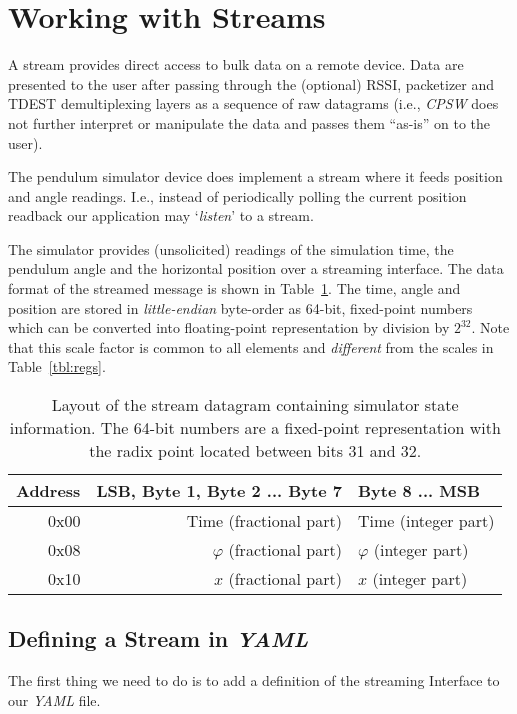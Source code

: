 \documentclass[10pt]{article}
\newcommand{\ita}[1]{\emph{#1}}
\newcommand{\cpsw}      {\ita {CPSW}}
\newcommand{\yaml}      {\ita {YAML}}
\newcounter{tbls}
\begin{document}
\section{Working with Streams}
A stream provides direct access to bulk data on a remote device. Data are
presented to the user after passing through the (optional) RSSI, packetizer
and TDEST demultiplexing layers as a sequence of raw datagrams (i.e., \cpsw{}
does not further interpret or manipulate the data and passes them ``as-is''
on to the user).

The pendulum simulator device does implement a stream where it feeds position
and angle readings. I.e., instead of periodically polling the current position
readback our application may `{\em listen}' to a stream.

The simulator provides (unsolicited) readings of the simulation time, the pendulum
angle and the horizontal position over a streaming interface. The data format
of the streamed message is shown in Table~\ref{tbl:strmmsg}. The time, angle and
position are stored in {\em little-endian} byte-order as 64-bit, fixed-point numbers
which can be converted into floating-point representation by division by $2^{32}$.
Note that this scale factor is common to all elements and {\em different} from the
scales in Table~\ref{tbl:regs}.

\begin{table}[ht]
\label{tbl:strmmsg}
\hspace*{\fill}
\begin{tabular}{rrl}
Address & LSB, Byte 1, Byte 2 ... Byte 7      & Byte 8 \hfill ... \hfill MSB \\
\hline
0x00    & Time      \hfill (fractional part)  & Time \hfill (integer part) \\
0x08    & $\varphi$ \hfill (fractional part)  & $\varphi$ \hfill (integer part) \\
0x10    & $x$       \hfill (fractional part)  & $x$       \hfill (integer part) \\
\end{tabular}
\hspace*{\fill}
\caption{Layout of the stream datagram containing simulator state information. The
64-bit numbers are a fixed-point representation with the radix point located between
bits 31 and 32.}
\end{table}

\subsection{Defining a Stream in \yaml}
The first thing we need to do is to add a definition of the streaming Interface to
our \yaml{} file.
\end{document}
